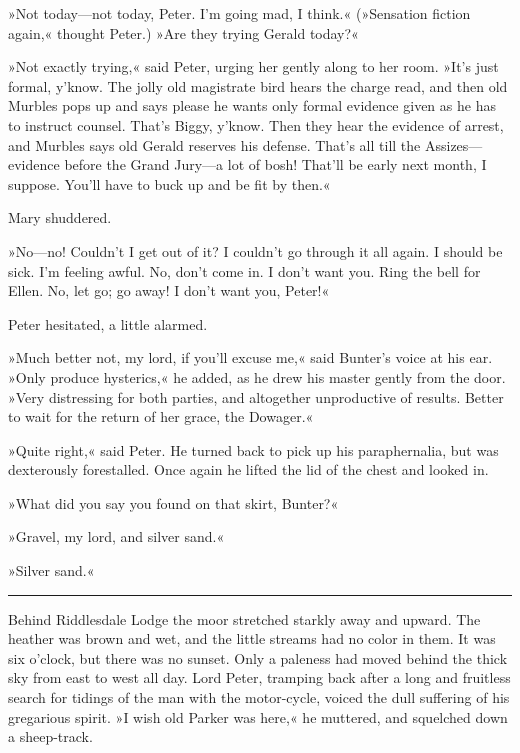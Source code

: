 »Not today\allowbreak---\allowbreak not today, Peter. I'm going mad, I think.« (»Sensation fiction again,« thought Peter.) »Are they trying Gerald today?«

»Not exactly trying,« said Peter, urging her gently along to her room.  »It's just formal, y'know. The jolly old magistrate bird hears the charge read, and then old Murbles pops up and says please he wants only formal evidence given as he has to instruct counsel. That's Biggy, y'know. Then they hear the evidence of arrest, and Murbles says old Gerald reserves his defense. That's all till the Assizes\allowbreak---\allowbreak evidence before the Grand Jury\allowbreak---\allowbreak a lot of bosh! That'll be early next month, I suppose. You'll have to buck up and be fit by then.«

Mary shuddered.

»No\allowbreak---\allowbreak no! Couldn't I get out of it? I couldn't go through it all again.  I should be sick. I'm feeling awful. No, don't come in. I don't want you. Ring the bell for Ellen. No, let go; go away! I don't want you, Peter!«

Peter hesitated, a little alarmed.

»Much better not, my lord, if you'll excuse me,« said Bunter's voice at his ear. »Only produce hysterics,« he added, as he drew his master gently from the door. »Very distressing for both parties, and altogether unproductive of results. Better to wait for the return of her grace, the Dowager.«

»Quite right,« said Peter. He turned back to pick up his paraphernalia, but was dexterously forestalled. Once again he lifted the lid of the chest and looked in.

»What did you say you found on that skirt, Bunter?«

»Gravel, my lord, and silver sand.«

»Silver sand.«

\noindent\hfil\rule{0.5\textwidth}{.4pt}\hfil

Behind Riddlesdale Lodge the moor stretched starkly away and upward.  The heather was brown and wet, and the little streams had no color in them. It was six o'clock, but there was no sunset. Only a paleness had moved behind the thick sky from east to west all day. Lord Peter, tramping back after a long and fruitless search for tidings of the man with the motor-cycle, voiced the dull suffering of his gregarious spirit. »I wish old Parker was here,« he muttered, and squelched down a sheep-track.

